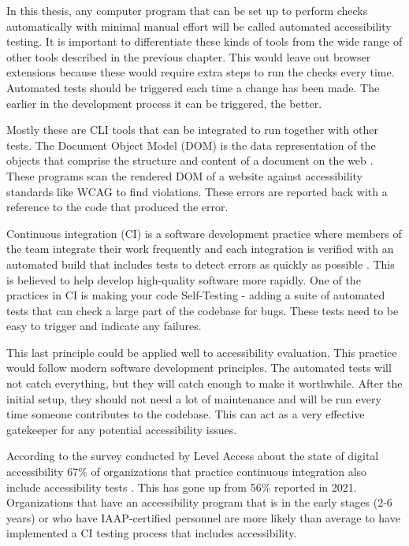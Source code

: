 \documentclass{master_thesis}
\begin{document}
In this thesis, any computer program that can be set up to perform checks automatically with minimal manual effort will be called automated accessibility testing. It is important to differentiate these kinds of tools from the wide range of other tools described in the previous chapter. This would leave out browser extensions because these would require extra steps to run the checks every time. Automated tests should be triggered each time a change has been made. The earlier in the development process it can be triggered, the better.

Mostly these are CLI tools that can be integrated to run together with other tests. The Document Object Model (DOM) is the data representation of the objects that comprise the structure and content of a document on the web \citep{MDN2023}. These programs scan the rendered DOM of a website against accessibility standards like WCAG to find violations. These errors are reported back with a reference to the code that produced the error.

Continuous integration (CI) is a software development practice where members of the team integrate their work frequently and each integration is verified with an automated build that includes tests to detect errors as quickly as possible \citep{Fowler2006}. This is believed to help develop high-quality software more rapidly. One of the practices in CI is making your code Self-Testing - adding a suite of automated tests that can check a large part of the codebase for bugs. These tests need to be easy to trigger and indicate any failures.

This last principle could be applied well to accessibility evaluation. This practice would follow modern software development principles. The automated tests will not catch everything, but they will catch enough to make it worthwhile. After the initial setup, they should not need a lot of maintenance and will be run every time someone contributes to the codebase. This can act as a very effective gatekeeper for any potential accessibility issues.

According to the survey conducted by Level Access about the state of digital accessibility 67\% of organizations that practice continuous integration also include accessibility tests \citep{LevelAccess}. This has gone up from 56\% reported in 2021. Organizations that have an accessibility program that is in the early stages (2-6 years) or who have IAAP-certified personnel are more likely than average to have implemented a CI testing process that includes accessibility.
\end{document}
